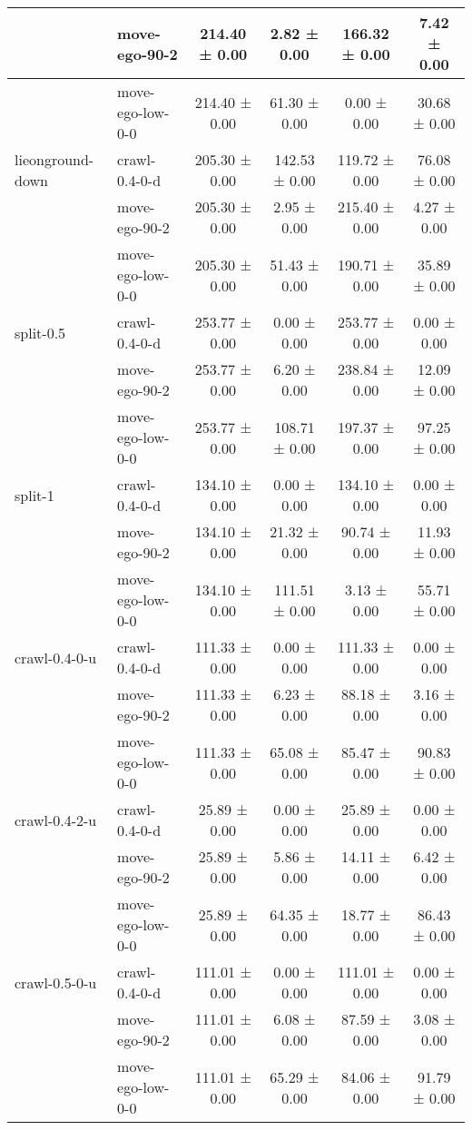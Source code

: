 \begin{tabular}{|l|l|c|c|c|c|}
\hline
 & move-ego-90-2 & 214.40 ± 0.00 & 2.82 ± 0.00 & 166.32 ± 0.00 & 7.42 ± 0.00 \\
\hline
 & move-ego-low-0-0 & 214.40 ± 0.00 & 61.30 ± 0.00 & 0.00 ± 0.00 & 30.68 ± 0.00 \\
\hline
lieonground-down & crawl-0.4-0-d & 205.30 ± 0.00 & 142.53 ± 0.00 & 119.72 ± 0.00 & 76.08 ± 0.00 \\
\hline
 & move-ego-90-2 & 205.30 ± 0.00 & 2.95 ± 0.00 & 215.40 ± 0.00 & 4.27 ± 0.00 \\
\hline
 & move-ego-low-0-0 & 205.30 ± 0.00 & 51.43 ± 0.00 & 190.71 ± 0.00 & 35.89 ± 0.00 \\
\hline
split-0.5 & crawl-0.4-0-d & 253.77 ± 0.00 & 0.00 ± 0.00 & 253.77 ± 0.00 & 0.00 ± 0.00 \\
\hline
 & move-ego-90-2 & 253.77 ± 0.00 & 6.20 ± 0.00 & 238.84 ± 0.00 & 12.09 ± 0.00 \\
\hline
 & move-ego-low-0-0 & 253.77 ± 0.00 & 108.71 ± 0.00 & 197.37 ± 0.00 & 97.25 ± 0.00 \\
\hline
split-1 & crawl-0.4-0-d & 134.10 ± 0.00 & 0.00 ± 0.00 & 134.10 ± 0.00 & 0.00 ± 0.00 \\
\hline
 & move-ego-90-2 & 134.10 ± 0.00 & 21.32 ± 0.00 & 90.74 ± 0.00 & 11.93 ± 0.00 \\
\hline
 & move-ego-low-0-0 & 134.10 ± 0.00 & 111.51 ± 0.00 & 3.13 ± 0.00 & 55.71 ± 0.00 \\
\hline
crawl-0.4-0-u & crawl-0.4-0-d & 111.33 ± 0.00 & 0.00 ± 0.00 & 111.33 ± 0.00 & 0.00 ± 0.00 \\
\hline
 & move-ego-90-2 & 111.33 ± 0.00 & 6.23 ± 0.00 & 88.18 ± 0.00 & 3.16 ± 0.00 \\
\hline
 & move-ego-low-0-0 & 111.33 ± 0.00 & 65.08 ± 0.00 & 85.47 ± 0.00 & 90.83 ± 0.00 \\
\hline
crawl-0.4-2-u & crawl-0.4-0-d & 25.89 ± 0.00 & 0.00 ± 0.00 & 25.89 ± 0.00 & 0.00 ± 0.00 \\
\hline
 & move-ego-90-2 & 25.89 ± 0.00 & 5.86 ± 0.00 & 14.11 ± 0.00 & 6.42 ± 0.00 \\
\hline
 & move-ego-low-0-0 & 25.89 ± 0.00 & 64.35 ± 0.00 & 18.77 ± 0.00 & 86.43 ± 0.00 \\
\hline
crawl-0.5-0-u & crawl-0.4-0-d & 111.01 ± 0.00 & 0.00 ± 0.00 & 111.01 ± 0.00 & 0.00 ± 0.00 \\
\hline
 & move-ego-90-2 & 111.01 ± 0.00 & 6.08 ± 0.00 & 87.59 ± 0.00 & 3.08 ± 0.00 \\
\hline
 & move-ego-low-0-0 & 111.01 ± 0.00 & 65.29 ± 0.00 & 84.06 ± 0.00 & 91.79 ± 0.00 \\

\end{tabular}
